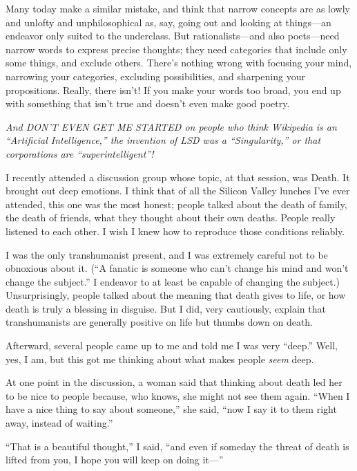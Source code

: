 {
 Many today make a similar mistake, and think that narrow concepts
are as lowly and unlofty and unphilosophical as, say, going out and
looking at things---an endeavor only suited to the underclass. But
rationalists---and also poets---need narrow words to express precise
thoughts; they need categories that include only some things, and
exclude others. There's nothing wrong with focusing
your mind, narrowing your categories, excluding possibilities, and
sharpening your propositions. Really, there isn't! If
you make your words too broad, you end up with something that
isn't true and doesn't even make good
poetry.}

{
 \textit{And DON'T EVEN GET ME STARTED on people
who think Wikipedia is an ``Artificial
Intelligence,'' the invention of LSD was a
``Singularity,'' or that
corporations are
``superintelligent''!}}

\myendsectiontext


\bigskip


{
 I recently attended a discussion group whose topic, at that
session, was Death. It brought out deep emotions. I think that of all
the Silicon Valley lunches I've ever attended, this one
was the most honest; people talked about the death of family, the death
of friends, what they thought about their own deaths. People really
listened to each other. I wish I knew how to reproduce those conditions
reliably. }

{
 I was the only transhumanist present, and I was extremely careful
not to be obnoxious about it. (``A fanatic is someone
who can't change his mind and won't
change the subject.'' I endeavor to at least be
capable of changing the subject.) Unsurprisingly, people talked about
the meaning that death gives to life, or how death is truly a blessing
in disguise. But I did, very cautiously, explain that transhumanists
are generally positive on life but thumbs down on death.}

{
 Afterward, several people came up to me and told me I was very
``deep.'' Well, yes, I am, but this
got me thinking about what makes people \textit{seem} deep.}

{
 At one point in the discussion, a woman said that thinking about
death led her to be nice to people because, who knows, she might not
see them again. ``When I have a nice thing to say
about someone,'' she said, ``now I
say it to them right away, instead of waiting.''}

{
 ``That is a beautiful
thought,'' I said, ``and even if
someday the threat of death is lifted from you, I hope you will keep on
doing it---''}

